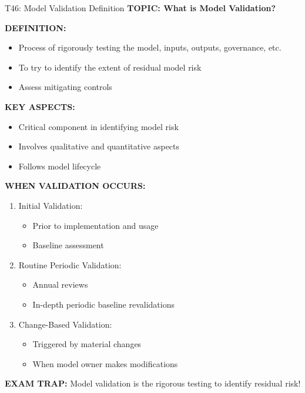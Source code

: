 \documentclass[8pt]{beamer}
\begin{document}
	
	\begin{frame}{T46: Model Validation Definition}
		\fontsize{6.5}{7.5}\selectfont
		\textbf{TOPIC: What is Model Validation?}
		
		\vspace{0.1cm}
		\textbf{DEFINITION:}
		\begin{itemize}
			\item Process of rigorously testing the model, inputs, outputs, governance, etc.
			\item To try to identify the extent of residual model risk
			\item Assess mitigating controls
		\end{itemize}
		
		\vspace{0.1cm}
		\textbf{KEY ASPECTS:}
		\begin{itemize}
			\item Critical component in identifying model risk
			\item Involves qualitative and quantitative aspects
			\item Follows model lifecycle
		\end{itemize}
		
		\vspace{0.1cm}
		\textbf{WHEN VALIDATION OCCURS:}
		\begin{enumerate}
			\item \textcolor{myblue}{Initial Validation:}
			\begin{itemize}
				\item Prior to implementation and usage
				\item Baseline assessment
			\end{itemize}
			\item \textcolor{myblue}{Routine Periodic Validation:}
			\begin{itemize}
				\item Annual reviews
				\item In-depth periodic baseline revalidations
			\end{itemize}
			\item \textcolor{myblue}{Change-Based Validation:}
			\begin{itemize}
				\item Triggered by material changes
				\item When model owner makes modifications
			\end{itemize}
		\end{enumerate}
		
		\textcolor{myred}{\textbf{EXAM TRAP:}} Model validation is the \textcolor{myblue}{rigorous testing to identify residual risk}!
	\end{frame}
	
\end{document}
